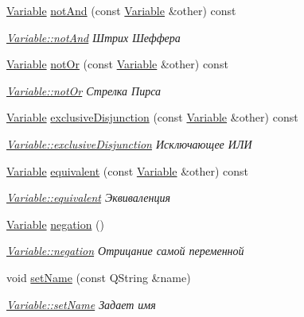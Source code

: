\begin{DoxyCompactItemize}
\hyperlink{class_variable}{Variable} \hyperlink{class_variable_a5b1b5220dae873cc4bf6d0700eba703e}{not\+And} (const \hyperlink{class_variable}{Variable} \&other) const
\begin{DoxyCompactList}\small\item\em \hyperlink{class_variable_a5b1b5220dae873cc4bf6d0700eba703e}{Variable\+::not\+And} Штрих Шеффера \end{DoxyCompactList}\item 
\hyperlink{class_variable}{Variable} \hyperlink{class_variable_aa71e11142a257fa6676257843879148c}{not\+Or} (const \hyperlink{class_variable}{Variable} \&other) const
\begin{DoxyCompactList}\small\item\em \hyperlink{class_variable_aa71e11142a257fa6676257843879148c}{Variable\+::not\+Or} Стрелка Пирса \end{DoxyCompactList}\item 
\hyperlink{class_variable}{Variable} \hyperlink{class_variable_a768fb534653ecc15e72f5d1201963705}{exclusive\+Disjunction} (const \hyperlink{class_variable}{Variable} \&other) const
\begin{DoxyCompactList}\small\item\em \hyperlink{class_variable_a768fb534653ecc15e72f5d1201963705}{Variable\+::exclusive\+Disjunction} Исключающее ИЛИ \end{DoxyCompactList}\item 
\hyperlink{class_variable}{Variable} \hyperlink{class_variable_a104b427ab0f43e9eb24f049ec6b524b0}{equivalent} (const \hyperlink{class_variable}{Variable} \&other) const
\begin{DoxyCompactList}\small\item\em \hyperlink{class_variable_a104b427ab0f43e9eb24f049ec6b524b0}{Variable\+::equivalent} Эквиваленция \end{DoxyCompactList}\item 
\hyperlink{class_variable}{Variable} \hyperlink{class_variable_a7f2a3b1b8540781703f5435253171978}{negation} ()
\begin{DoxyCompactList}\small\item\em \hyperlink{class_variable_a7f2a3b1b8540781703f5435253171978}{Variable\+::negation} Отрицание самой переменной \end{DoxyCompactList}\item 
void \hyperlink{class_variable_ab58f8291d67e633fd1ad76148fad9e1a}{set\+Name} (const Q\+String \&name)
\begin{DoxyCompactList}\small\item\em \hyperlink{class_variable_ab58f8291d67e633fd1ad76148fad9e1a}{Variable\+::set\+Name} Задает имя \end{DoxyCompactList}\item 

\end{DoxyCompactItemize}
